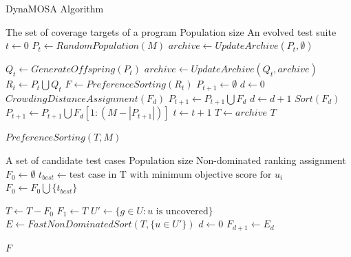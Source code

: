 \documentclass[paper=a4,%
  twoside,%
  BCOR4mm,%
  abstract=true,%
  toc=bibliography,%
  chapterprefix=true,%
  toc=bibliographynumbered,%
  open=right,%
  english,%
  pagesize=pdftex]{scrreprt}
\newcommand{\Desc}[2]{\State \makebox[2em][l]{#1}#2}
\begin{document}
\begin{algorithm}[t]
\caption{DynaMOSA Algorithm~\cite{Panichella2018}}\label{alg:dynamosa}
\begin{algorithmic}
\Input
  \Desc{$U$}{The set of coverage targets of a program}
  \Desc{$M$}{Population size}
  \EndInput
  \Output
  \Desc{$T$}{An evolved test suite}
  \EndOutput
\State $t \gets 0$
\State $P_t \gets RandomPopulation(M)$
\State $archive \gets UpdateArchive(P_t, \emptyset)$

    \State $Q_t \gets GenerateOffspring(P_t)$
    \State $archive \gets UpdateArchive(Q_t, archive)$
    \State $R_t \gets P_t \bigcup Q_t$
    \State $F \gets PreferenceSorting(R_t)$
    \State $P_{t + 1} \gets \emptyset$
    \State $d \gets 0$
        \State $CrowdingDistanceAssignment(F_d)$
        \State $P_{t + 1} \gets P_{t + 1} \bigcup F_d$
        \State $d \gets d + 1$
    \EndWhile
    \State $Sort(F_d)$
    \State $P_{t + 1} \gets P_{t + 1} \bigcup F_d[1 : (M - \left| P_{t + 1} \right|)]$
    \State $t \gets t +  1$
\EndWhile
\State $T \gets archive$
\State \Return $T$
\end{algorithmic}
\end{algorithm}

\begin{algorithm}[t]
\caption{$PreferenceSorting(T, M)$~\cite{Panichella2018}}\label{alg:preference-sorting}
\begin{algorithmic}
\Input
  \Desc{$T$}{A set of candidate test cases}
  \Desc{$M$}{Population size}
  \EndInput
  \Output
  \Desc{$F$}{Non-dominated ranking assignment}
  \EndOutput
\State $F_0 \gets \emptyset$
\State $t_{best} \gets \textrm{test case in T with minimum objective score for } u_i$
\State $F_0 \gets F_0 \bigcup \{t_{best}\}$
\EndFor

\State $T \gets T - F_0$
\State $F_1 \gets T$
\Else
\State $U' \gets \{g \in U : u \textrm{ is uncovered}\}$
\State $E \gets FastNonDominatedSort(T, \{u \in U'\})$
\State $d \gets 0$
\State $F_{d + 1} \gets E_d$
\EndFor
\EndIf

\State \Return $F$
\end{algorithmic}
\end{algorithm}
\end{document}
